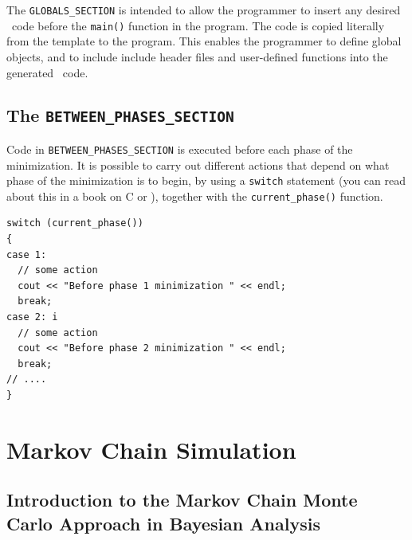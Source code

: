 \documentclass{admbmanual}
\begin{document}
The \texttt{GLOBALS\_SECTION} is intended to allow the programmer to insert any
desired \cplus\ code before the \texttt{main()} function in the program. The
code is copied literally from the template to the program. This enables the
programmer to define global objects, and to include include header files and
user-defined functions into the generated \cplus\ code.


\section{The \texttt{BETWEEN\_PHASES\_SECTION}}

Code in \texttt{BETWEEN\_PHASES\_SECTION} is executed before each phase of the
minimization. It is possible to carry out different actions that depend on what
phase of the minimization is to begin, by using a \texttt{switch} statement (you
can read about this in a book on C or \cplus), together with the
\texttt{current\_phase()} function.
\begin{lstlisting}
switch (current_phase())
{
case 1:
  // some action
  cout << "Before phase 1 minimization " << endl;
  break;
case 2: i
  // some action
  cout << "Before phase 2 minimization " << endl;
  break;
// ....
}
\end{lstlisting}


\chapter{Markov Chain Simulation}

\section{Introduction to the Markov Chain Monte Carlo\br
  Approach in Bayesian Analysis}
\end{document}
